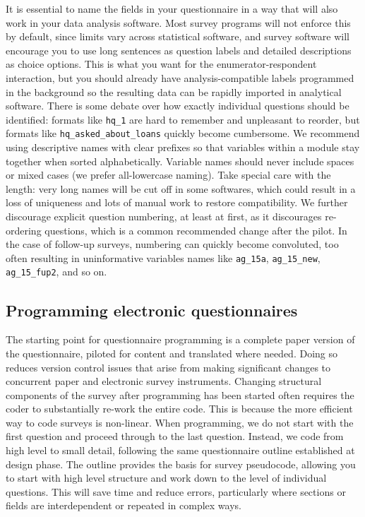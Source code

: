 It is essential to name the fields in your questionnaire
in a way that will also work in your data analysis software.
Most survey programs will not enforce this by default,
since limits vary across statistical software,
and survey software will encourage you
to use long sentences as question labels
and detailed descriptions as choice options.
This is what you want for the enumerator-respondent interaction,
but you should already have analysis-compatible labels programmed in the background
so the resulting data can be rapidly imported in analytical software.
There is some debate over how exactly individual questions should be identified:
formats like \texttt{hq\_1} are hard to remember and unpleasant to reorder,
but formats like \texttt{hq\_asked\_about\_loans} quickly become cumbersome.
We recommend using descriptive names with clear prefixes so that variables
within a module stay together when sorted alphabetically.
Variable names should never include spaces or mixed cases
(we prefer all-lowercase naming).
Take special care with the length: very long names will be cut off in some softwares,
which could result in a loss of uniqueness and lots of manual work to restore compatibility.
We further discourage explicit question numbering,
at least at first, as it discourages re-ordering questions,
which is a common recommended change after the pilot.
In the case of follow-up surveys, numbering can quickly become convoluted,
too often resulting in uninformative variables names like
\texttt{ag\_15a}, \texttt{ag\_15\_new}, \texttt{ag\_15\_fup2}, and so on.

\subsection{Programming electronic questionnaires}

The starting point for questionnaire programming
is a complete paper version of the questionnaire,
piloted for content and translated where needed.
Doing so reduces version control issues
that arise from making significant changes
to concurrent paper and electronic survey instruments.
Changing structural components of the survey
after programming has been started
often requires the coder to substantially re-work the entire code.
This is because the more efficient way to code surveys is non-linear.
When programming, we do not start with the first question and proceed through to the last question.
Instead, we code from high level to small detail,
following the same questionnaire outline established at design phase.
The outline provides the basis for survey pseudocode,
allowing you to start with high level structure and work down to the level of individual questions.
This will save time and reduce errors,
particularly where sections or fields
are interdependent or repeated in complex ways.

